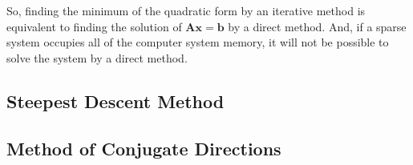 So, finding the minimum of the quadratic form by an iterative method is equivalent to finding the solution of $\mathbf{A}\mathbf{x} = \mathbf{b}$ by a direct method. And, if a sparse system occupies all of the computer system memory, it will not be possible to solve the system by a direct method.


%
%
\subsection{Steepest Descent Method}


%
%
\subsection{Method of Conjugate Directions}













